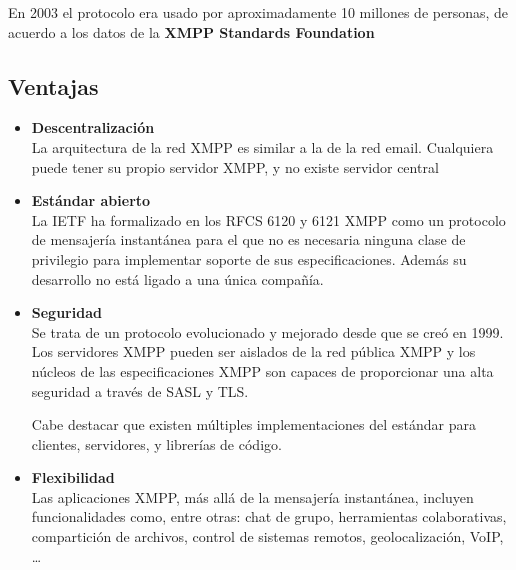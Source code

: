 \documentclass[a4paper, 11pt]{article} %
\begin{document}
  En 2003 el protocolo era usado por aproximadamente 10 millones de personas, de acuerdo a los datos de la \textbf{XMPP
  Standards Foundation}	
   
   \subsection{Ventajas}
   \begin{itemize}
     \item \textbf{Descentralización}\\
     La arquitectura de la red XMPP es similar a la de la red email. Cualquiera puede tener su propio servidor XMPP, y
     no existe servidor central
     \item \textbf{Estándar abierto}\\
     La IETF ha formalizado en los RFCS 6120 y 6121 XMPP como un protocolo de mensajería instantánea para el que no es
     necesaria ninguna clase de privilegio para implementar soporte de sus especificaciones. Además su desarrollo no está ligado
     a una única compañía.
     \item \textbf{Seguridad}\\
     Se trata de un protocolo evolucionado y mejorado desde que se creó en 1999. Los servidores XMPP pueden ser aislados
     de la red pública XMPP y los núcleos de las especificaciones XMPP son capaces de proporcionar una alta seguridad
     a través de SASL y TLS.
     
     Cabe destacar que existen múltiples implementaciones del estándar para clientes, servidores, y librerías de código.
     \item \textbf{Flexibilidad}\\
     Las aplicaciones XMPP, más allá de la mensajería instantánea, incluyen funcionalidades como, entre otras: chat de grupo, 
     herramientas colaborativas, compartición de archivos, control de sistemas remotos, geolocalización, VoIP, \ldots
   \end{itemize}
 
\end{document}
